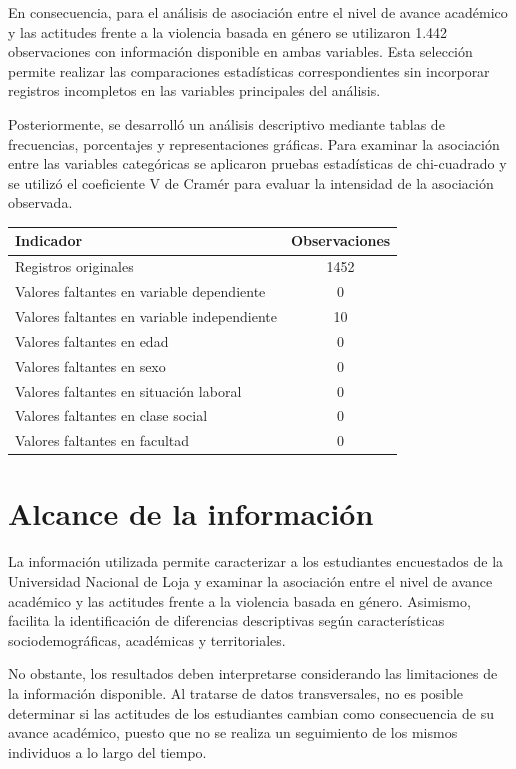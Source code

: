 \documentclass[
  spanish,
  11pt,
  letterpaper,
  DIV=11,
  numbers=noendperiod]{scrreprt}
\newcounter{none} %
\begin{document}
En consecuencia, para el análisis de asociación entre el nivel de avance
académico y las actitudes frente a la violencia basada en género se
utilizaron 1.442 observaciones con información disponible en ambas
variables. Esta selección permite realizar las comparaciones
estadísticas correspondientes sin incorporar registros incompletos en
las variables principales del análisis.

Posteriormente, se desarrolló un análisis descriptivo mediante tablas de
frecuencias, porcentajes y representaciones gráficas. Para examinar la
asociación entre las variables categóricas se aplicaron pruebas
estadísticas de chi-cuadrado y se utilizó el coeficiente V de Cramér
para evaluar la intensidad de la asociación observada.

{\def\LTcaptype{none} %
\begin{longtable}[]{@{}lc@{}}
\toprule\noalign{}
Indicador & Observaciones \\
\midrule\noalign{}
\endhead
\bottomrule\noalign{}
\endlastfoot
Registros originales & 1452 \\
Valores faltantes en variable dependiente & 0 \\
Valores faltantes en variable independiente & 10 \\
Valores faltantes en edad & 0 \\
Valores faltantes en sexo & 0 \\
Valores faltantes en situación laboral & 0 \\
Valores faltantes en clase social & 0 \\
Valores faltantes en facultad & 0 \\
\end{longtable}
}

\section{Alcance de la información}\label{alcance-de-la-informaciuxf3n}

La información utilizada permite caracterizar a los estudiantes
encuestados de la Universidad Nacional de Loja y examinar la asociación
entre el nivel de avance académico y las actitudes frente a la violencia
basada en género. Asimismo, facilita la identificación de diferencias
descriptivas según características sociodemográficas, académicas y
territoriales.

No obstante, los resultados deben interpretarse considerando las
limitaciones de la información disponible. Al tratarse de datos
transversales, no es posible determinar si las actitudes de los
estudiantes cambian como consecuencia de su avance académico, puesto que
no se realiza un seguimiento de los mismos individuos a lo largo del
tiempo.
\end{document}
